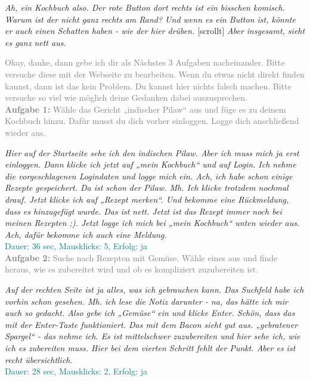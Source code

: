 \documentclass[parskip,10pt,abstracton]{scrartcl}
\begin{document}
\begin{appendix}
\textit{Ah, ein Kochbuch also. Der rote Button dort rechts ist ein bisschen komisch. Warum ist der nicht ganz rechts am Rand? Und wenn es ein Button ist, könnte er auch einen Schatten haben - wie der hier drüben.} [scrollt] \textit{Aber insgesamt, sieht es ganz nett aus.}

\textcolor{gray}{
Okay, danke, dann gebe ich dir als Nächstes 3 Aufgaben nacheinander. Bitte versuche diese mit der Webseite zu bearbeiten. Wenn du etwas nicht direkt finden kannst, dann ist das kein Problem. Du kannst hier nichts falsch machen. Bitte versuche so viel wie möglich deine Gedanken dabei auszusprechen.}\\

\textcolor{gray}{
\textbf{Aufgabe 1:} Wähle das Gericht „indischer Pilaw“ aus und füge es zu deinem Kochbuch hinzu. Dafür musst du dich vorher einloggen. Logge dich anschließend wieder aus.}

\textit{Hier auf der Startseite sehe ich den indischen Pilaw. Aber ich muss mich ja erst einloggen. Dann klicke ich jetzt auf „mein Kochbuch“ und auf Login. Ich nehme die vorgeschlagenen Logindaten und logge mich ein. Ach, ich habe schon einige Rezepte gespeichert. Da ist schon der Pilaw. Mh. Ich klicke trotzdem nochmal drauf. Jetzt klicke ich auf „Rezept merken“. Und bekomme eine Rückmeldung, dass es hinzugefügt wurde. Das ist nett. Jetzt ist das Rezept immer noch bei meinen Rezepten ;). Jetzt logge ich mich bei „mein Kochbuch“ unten wieder aus. Ach, dafür bekomme ich auch eine Meldung.}\\
\textcolor{teal}{Dauer: 36 sec, Mausklicks: 5, Erfolg: ja}\\


\textcolor{gray}{
\textbf{Aufgabe 2:} Suche nach Rezepten mit Gemüse. Wähle eines aus und finde heraus, wie es zubereitet wird und ob es kompliziert zuzubereiten ist.}

\textit{Auf der rechten Seite ist ja alles, was ich gebrauchen kann. Das Suchfeld habe ich vorhin schon gesehen. Mh. ich lese die Notiz darunter - na, das hätte ich mir auch so gedacht. Also gebe ich „Gemüse“ ein und klicke Enter. Schön, dass das mit der Enter-Taste funktioniert. Das mit dem Bacon sieht gut aus. „gebratener Spargel“ - das nehme ich. Es ist mittelschwer zuzubereiten und hier sehe ich, wie ich es zubereiten muss. Hier bei dem vierten Schritt fehlt der Punkt. Aber es ist recht übersichtlich.}\\
\textcolor{teal}{Dauer: 28 sec, Mausklicks: 2, Erfolg: ja}\\



\end{appendix}
\end{document}
